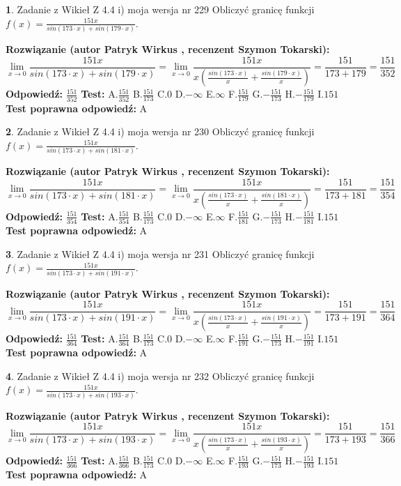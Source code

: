 \documentclass[12pt, a4paper]{article}
\theoremstyle{definition} %
\newtheorem{zad}{}
\newcommand{\zadStart}[1]{\begin{zad}#1\newline}
\newcommand{\zadStop}{\end{zad}}
\newcommand{\rozwStart}[2]{\noindent \textbf{Rozwiązanie (autor #1 , recenzent #2): }\newline}
\newcommand{\rozwStop}{\newline}
\newcommand{\odpStart}{\noindent \textbf{Odpowiedź:}\newline}
\newcommand{\odpStop}{\newline}
\newcommand{\testStart}{\noindent \textbf{Test:}\newline}
\newcommand{\testStop}{\newline}
\newcommand{\kluczStart}{\noindent \textbf{Test poprawna odpowiedź:}\newline}
\newcommand{\kluczStop}{\newline}
\begin{document}
\zadStart{Zadanie z Wikieł Z 4.4 i) moja wersja nr 229}
Obliczyć granicę funkcji $f(x)=\frac{151x}{sin(173\cdot x) +sin(179\cdot x)}$.
\zadStop
\rozwStart{Patryk Wirkus}{Szymon Tokarski}
$$\lim\limits_{x\to 0}\frac{151x}{sin(173\cdot x) +sin(179\cdot x)}=\lim\limits_{x\to 0}\frac{151x}{x(\frac{sin(173\cdot x)}{x}+\frac{sin(179\cdot x)}{x})}=\frac{151}{173+179} = \frac{151}{352}$$
\rozwStop
\odpStart
$\frac{151}{352}$
\odpStop
\testStart
A.$\frac{151}{352}$
B.$\frac{151}{173}$
C.$0$
D.$-\infty$
E.$\infty$
F.$\frac{151}{179}$
G.$-\frac{151}{173}$
H.$-\frac{151}{179}$
I.$151$
\testStop
\kluczStart
A
\kluczStop



\zadStart{Zadanie z Wikieł Z 4.4 i) moja wersja nr 230}
Obliczyć granicę funkcji $f(x)=\frac{151x}{sin(173\cdot x) +sin(181\cdot x)}$.
\zadStop
\rozwStart{Patryk Wirkus}{Szymon Tokarski}
$$\lim\limits_{x\to 0}\frac{151x}{sin(173\cdot x) +sin(181\cdot x)}=\lim\limits_{x\to 0}\frac{151x}{x(\frac{sin(173\cdot x)}{x}+\frac{sin(181\cdot x)}{x})}=\frac{151}{173+181} = \frac{151}{354}$$
\rozwStop
\odpStart
$\frac{151}{354}$
\odpStop
\testStart
A.$\frac{151}{354}$
B.$\frac{151}{173}$
C.$0$
D.$-\infty$
E.$\infty$
F.$\frac{151}{181}$
G.$-\frac{151}{173}$
H.$-\frac{151}{181}$
I.$151$
\testStop
\kluczStart
A
\kluczStop



\zadStart{Zadanie z Wikieł Z 4.4 i) moja wersja nr 231}
Obliczyć granicę funkcji $f(x)=\frac{151x}{sin(173\cdot x) +sin(191\cdot x)}$.
\zadStop
\rozwStart{Patryk Wirkus}{Szymon Tokarski}
$$\lim\limits_{x\to 0}\frac{151x}{sin(173\cdot x) +sin(191\cdot x)}=\lim\limits_{x\to 0}\frac{151x}{x(\frac{sin(173\cdot x)}{x}+\frac{sin(191\cdot x)}{x})}=\frac{151}{173+191} = \frac{151}{364}$$
\rozwStop
\odpStart
$\frac{151}{364}$
\odpStop
\testStart
A.$\frac{151}{364}$
B.$\frac{151}{173}$
C.$0$
D.$-\infty$
E.$\infty$
F.$\frac{151}{191}$
G.$-\frac{151}{173}$
H.$-\frac{151}{191}$
I.$151$
\testStop
\kluczStart
A
\kluczStop



\zadStart{Zadanie z Wikieł Z 4.4 i) moja wersja nr 232}
Obliczyć granicę funkcji $f(x)=\frac{151x}{sin(173\cdot x) +sin(193\cdot x)}$.
\zadStop
\rozwStart{Patryk Wirkus}{Szymon Tokarski}
$$\lim\limits_{x\to 0}\frac{151x}{sin(173\cdot x) +sin(193\cdot x)}=\lim\limits_{x\to 0}\frac{151x}{x(\frac{sin(173\cdot x)}{x}+\frac{sin(193\cdot x)}{x})}=\frac{151}{173+193} = \frac{151}{366}$$
\rozwStop
\odpStart
$\frac{151}{366}$
\odpStop
\testStart
A.$\frac{151}{366}$
B.$\frac{151}{173}$
C.$0$
D.$-\infty$
E.$\infty$
F.$\frac{151}{193}$
G.$-\frac{151}{173}$
H.$-\frac{151}{193}$
I.$151$
\testStop
\kluczStart
A
\kluczStop
\end{document}
